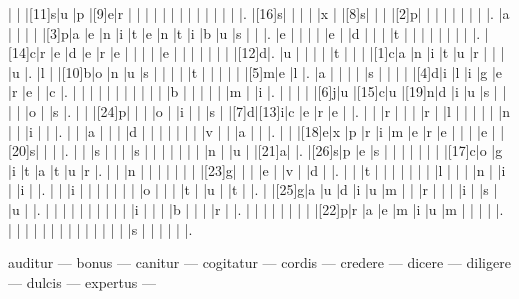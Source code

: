 \documentclass[12pt]{article}
\begin{document}
\begin{Puzzle}{22}{24}
  |{}  |{}  |[11]s|u   |p   |[9]e|r   |{}  |{}  |{}  |{}  |{}  |{}  |{}  |{}  |{}  |{}  |{}  |{}  |{}  |.
  |[16]s|{}  |{}  |{}  |{}  |x   |{}  |[8]s|{}  |{}  |{}  |[2]p|{}  |{}  |{}  |{}  |{}  |{}  |{}  |{}  |.
  |a   |{}  |{}  |{}  |{}  |[3]p|a   |e   |n   |i   |t   |e   |n   |t   |i   |b   |u   |s   |{}  |{}  |.
  |e   |{}  |{}  |{}  |{}  |e   |{}  |d   |{}  |{}  |{}  |t   |{}  |{}  |{}  |{}  |{}  |{}  |{}  |{}  |.
  |[14]c|r   |e   |d   |e   |r   |e   |{}  |{}  |{}  |{}  |e   |{}  |{}  |{}  |{}  |{}  |{}  |{}  |[12]d|.
  |u   |{}  |{}  |{}  |{}  |t   |{}  |{}  |{}  |[1]c|a   |n   |i   |t   |u   |r   |{}  |{}  |{}  |u   |.
  |l   |{}  |[10]b|o   |n   |u   |s   |{}  |{}  |{}  |{}  |t   |{}  |{}  |{}  |{}  |{}  |[5]m|e   |l   |.
  |a   |{}  |{}  |{}  |{}  |s   |{}  |{}  |{}  |{}  |[4]d|i   |l   |i   |g   |e   |r   |e   |{}  |c   |.
  |{}  |{}  |{}  |{}  |{}  |{}  |{}  |{}  |{}  |{}  |{}  |b   |{}  |{}  |{}  |{}  |{}  |m   |{}  |i   |.
  |{}  |{}  |{}  |{}  |[6]j|u   |[15]c|u   |[19]n|d   |i   |u   |s   |{}  |{}  |{}  |{}  |o   |{}  |s   |.
  |{}  |{}  |[24]p|{}  |{}  |{}  |o   |{}  |i   |{}  |{}  |s   |{}  |[7]d|[13]i|c   |e   |r   |e   |{}  |.
  |{}  |{}  |r   |{}  |{}  |{}  |r   |{}  |l   |{}  |{}  |{}  |{}  |{}  |n   |{}  |{}  |i   |{}  |{}  |.
  |{}  |{}  |a   |{}  |{}  |{}  |d   |{}  |{}  |{}  |{}  |{}  |{}  |{}  |v   |{}  |{}  |a   |{}  |{}  |.
  |{}  |{}  |[18]e|x   |p   |r   |i   |m   |e   |r   |e   |{}  |{}  |{}  |e   |{}  |[20]s|{}  |{}  |{}  |.
  |{}  |{}  |s   |{}  |{}  |{}  |s   |{}  |{}  |{}  |{}  |{}  |{}  |{}  |n   |{}  |u   |{}  |[21]a|{}  |.
  |[26]s|p   |e   |s   |{}  |{}  |{}  |{}  |{}  |{}  |{}  |[17]c|o   |g   |i   |t   |a   |t   |u   |r   |.
  |{}  |{}  |n   |{}  |{}  |{}  |{}  |{}  |{}  |{}  |[23]g|{}  |{}  |{}  |e   |{}  |v   |{}  |d   |{}  |.
  |{}  |{}  |t   |{}  |{}  |{}  |{}  |{}  |{}  |{}  |l   |{}  |{}  |{}  |n   |{}  |i   |{}  |i   |{}  |.
  |{}  |{}  |i   |{}  |{}  |{}  |{}  |{}  |{}  |{}  |o   |{}  |{}  |{}  |t   |{}  |u   |{}  |t   |{}  |.
  |{}  |[25]g|a   |u   |d   |i   |u   |m   |{}  |{}  |r   |{}  |{}  |{}  |i   |{}  |s   |{}  |u   |{}  |.
  |{}  |{}  |{}  |{}  |{}  |{}  |{}  |{}  |{}  |{}  |i   |{}  |{}  |{}  |b   |{}  |{}  |{}  |r   |{}  |.
  |{}  |{}  |{}  |{}  |{}  |{}  |{}  |{}  |[22]p|r   |a   |e   |m   |i   |u   |m   |{}  |{}  |{}  |{}  |.
  |{}  |{}  |{}  |{}  |{}  |{}  |{}  |{}  |{}  |{}  |{}  |{}  |{}  |{}  |s   |{}  |{}  |{}  |{}  |{}  |.
\end{Puzzle}
\begin{rotate}{90}
\small 
\qquad auditur --- bonus --- canitur --- cogitatur --- cordis --- credere --- dicere --- diligere --- dulcis --- expertus --- 
\end{rotate}
\end{document}
